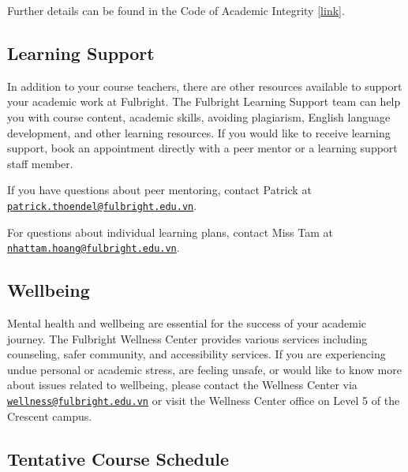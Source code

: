 \documentclass[
]{article}
\begin{document}
Further details can be found in the Code of Academic Integrity {[}\href{https://fulbright.edu.vn/articles/Code\%20of\%20Academic\%20Integrity/Code\%20of\%20Academic\%20Integrity_\%20Excom\%20Endorsed.pdf}{link}{]}.

\hypertarget{learning-support}{%
\subsection*{Learning Support}\label{learning-support}}

In addition to your course teachers, there are other resources available to support your academic work at Fulbright. The Fulbright Learning Support team can help you with course content, academic skills, avoiding plagiarism, English language development, and other learning resources.
If you would like to receive learning support, book an appointment directly with a peer mentor or a learning support staff member.

If you have questions about peer mentoring, contact Patrick at \href{mailto:patrick.thoendel@fulbright.edu.vn}{\nolinkurl{patrick.thoendel@fulbright.edu.vn}}.

For questions about individual learning plans, contact Miss Tam at \href{mailto:nhattam.hoang@fulbright.edu.vn}{\nolinkurl{nhattam.hoang@fulbright.edu.vn}}.

\hypertarget{wellbeing}{%
\subsection*{Wellbeing}\label{wellbeing}}

Mental health and wellbeing are essential for the success of your academic journey. The
Fulbright Wellness Center provides various services including counseling, safer community,
and accessibility services. If you are experiencing undue personal or academic stress, are
feeling unsafe, or would like to know more about issues related to wellbeing, please contact
the Wellness Center via \href{mailto:wellness@fulbright.edu.vn}{\nolinkurl{wellness@fulbright.edu.vn}} or visit the Wellness Center office on
Level 5 of the Crescent campus.

\newpage

\hypertarget{tentative-course-schedule}{%
\subsection*{Tentative Course Schedule}\label{tentative-course-schedule}}
\end{document}
